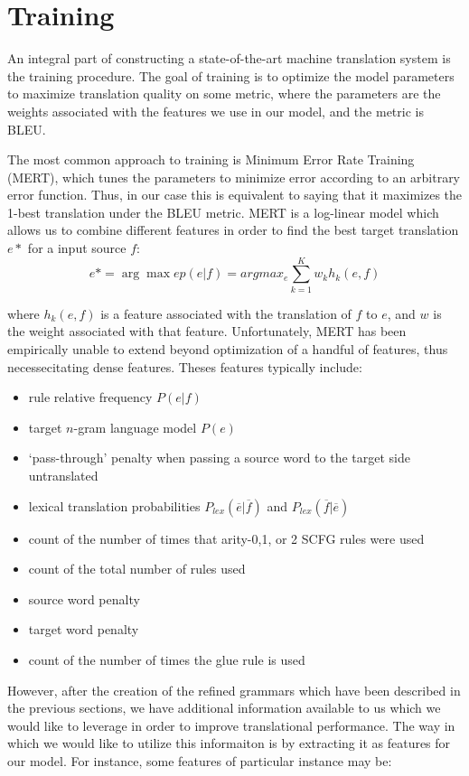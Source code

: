 \chapter{Training}

An integral part of constructing a state-of-the-art machine translation system is the training procedure. The goal of training is to optimize the model parameters to maximize translation quality on some metric, where the parameters are the weights associated with the features we use in our model, and the metric is BLEU. 

The most common approach to training is Minimum Error Rate Training (MERT), which tunes the parameters to minimize error according to an arbitrary error function. Thus, in our case this is equivalent to saying that it maximizes the 1-best translation under the BLEU metric. MERT is a log-linear model which allows us to combine different features in order to find the best target translation $e*$ for a input source $f$:
$$e* = \arg\max e p(e|f) = argmax_e \sum_{k=1}^K w_kh_k(e,f)$$

where $h_k(e,f)$ is a feature associated with the translation of $f$ to $e$, and $w$ is the weight associated with that feature. Unfortunately, MERT has been empirically unable to extend beyond optimization of a handful of features, thus necessecitating dense features. Theses features typically include:

\begin{itemize}
\item rule relative frequency $P(e|f)$
\item target $n$-gram language model $P(e)$
\item `pass-through' penalty when passing a source word to the target side untranslated
\item lexical translation probabilities $P_{lex}(\overline{e}|\overline{f})$ and $P_{lex}(\overline{f}|\overline{e})$
\item count of the number of times that arity-0,1, or 2 SCFG rules were used 
\item count of the total number of rules used
\item source word penalty
\item target word penalty
\item count of the number of times the glue rule is used 
\end{itemize} 

However, after the creation of the refined grammars which have been described in the previous sections, we have additional information available to us which we would like to leverage in order to improve translational performance. The way in which we would like to utilize this informaiton is by extracting it as features for our model. For instance, some features of particular instance may be:

